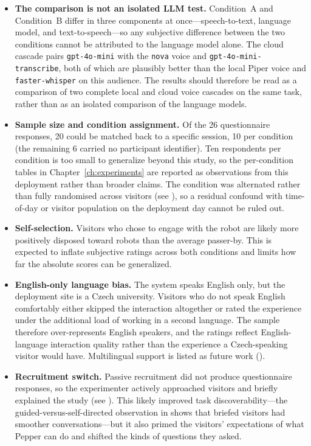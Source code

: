 \begin{itemize}
    \item \textbf{The comparison is not an isolated LLM test.}
    Condition~A and Condition~B differ in three components at once---speech-to-text, language model, and text-to-speech---so any subjective difference between the two conditions cannot be attributed to the language model alone.
    The cloud cascade pairs \texttt{gpt-4o-mini} with the \texttt{nova} voice and \texttt{gpt-4o-mini-transcribe}, both of which are plausibly better than the local Piper voice and \texttt{faster-whisper} on this audience.
    The results should therefore be read as a comparison of two complete local and cloud voice cascades on the same task, rather than as an isolated comparison of the language models.

    \item \textbf{Sample size and condition assignment.}
    Of the 26 questionnaire responses, 20 could be matched back to a specific session, 10 per condition (the remaining 6 carried no participant identifier). Ten respondents per condition is too small to generalize beyond this study, so the per-condition tables in Chapter~\ref{ch:experiments} are reported as observations from this deployment rather than broader claims.
    The condition was alternated rather than fully randomised across visitors (see ), so a residual confound with time-of-day or visitor population on the deployment day cannot be ruled out.

    \item \textbf{Self-selection.}
    Visitors who chose to engage with the robot are likely more positively disposed toward robots than the average passer-by.
    This is expected to inflate subjective ratings across both conditions and limits how far the absolute scores can be generalized.

    \item \textbf{English-only language bias.}
    The system speaks English only, but the deployment site is a Czech university.
    Visitors who do not speak English comfortably either skipped the interaction altogether or rated the experience under the additional load of working in a second language.
    The sample therefore over-represents English speakers, and the ratings reflect English-language interaction quality rather than the experience a Czech-speaking visitor would have.
    Multilingual support is listed as future work ().

    \item \textbf{Recruitment switch.}
    Passive recruitment did not produce questionnaire responses, so the experimenter actively approached visitors and briefly explained the study (see ).
    This likely improved task discoverability---the guided-versus-self-directed observation in  shows that briefed visitors had smoother conversations---but it also primed the visitors' expectations of what Pepper can do and shifted the kinds of questions they asked.


\end{itemize}
